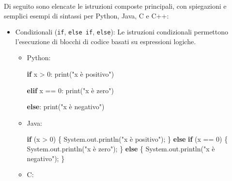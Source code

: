 \documentclass[
  letterpaper,
]{scrbook}
\newenvironment{Shaded}{\begin{snugshade}}{\end{snugshade}}
\newcommand{\BuiltInTok}[1]{\textcolor[rgb]{0.00,0.23,0.31}{#1}}
\newcommand{\ControlFlowTok}[1]{\textcolor[rgb]{0.00,0.23,0.31}{\textbf{#1}}}
\newcommand{\DecValTok}[1]{\textcolor[rgb]{0.68,0.00,0.00}{#1}}
\newcommand{\FunctionTok}[1]{\textcolor[rgb]{0.28,0.35,0.67}{#1}}
\newcommand{\NormalTok}[1]{\textcolor[rgb]{0.00,0.23,0.31}{#1}}
\newcommand{\OperatorTok}[1]{\textcolor[rgb]{0.37,0.37,0.37}{#1}}
\newcommand{\StringTok}[1]{\textcolor[rgb]{0.13,0.47,0.30}{#1}}
\begin{document}
Di seguito sono elencate le istruzioni composte principali, con
spiegazioni e semplici esempi di sintassi per Python, Java, C e C++:

\begin{itemize}
\item
  Condizionali (\texttt{if}, \texttt{else\ if}, \texttt{else}): Le
  istruzioni condizionali permettono l'esecuzione di blocchi di codice
  basati su espressioni logiche.

  \begin{itemize}
  \item
    Python:

\begin{Shaded}
\begin{Highlighting}[]
\ControlFlowTok{if}\NormalTok{ x }\OperatorTok{\textgreater{}} \DecValTok{0}\NormalTok{:}
  \BuiltInTok{print}\NormalTok{(}\StringTok{"x è positivo"}\NormalTok{)}

\ControlFlowTok{elif}\NormalTok{ x }\OperatorTok{==} \DecValTok{0}\NormalTok{:}
  \BuiltInTok{print}\NormalTok{(}\StringTok{"x è zero"}\NormalTok{)}

\ControlFlowTok{else}\NormalTok{:}
  \BuiltInTok{print}\NormalTok{(}\StringTok{"x è negativo"}\NormalTok{)}
\end{Highlighting}
\end{Shaded}
  \item
    Java:

\begin{Shaded}
\begin{Highlighting}[]
\ControlFlowTok{if} \OperatorTok{(}\NormalTok{x }\OperatorTok{\textgreater{}} \DecValTok{0}\OperatorTok{)} \OperatorTok{\{}
  \BuiltInTok{System}\OperatorTok{.}\FunctionTok{out}\OperatorTok{.}\FunctionTok{println}\OperatorTok{(}\StringTok{"x è positivo"}\OperatorTok{);}
\OperatorTok{\}} \ControlFlowTok{else} \ControlFlowTok{if} \OperatorTok{(}\NormalTok{x }\OperatorTok{==} \DecValTok{0}\OperatorTok{)} \OperatorTok{\{}
  \BuiltInTok{System}\OperatorTok{.}\FunctionTok{out}\OperatorTok{.}\FunctionTok{println}\OperatorTok{(}\StringTok{"x è zero"}\OperatorTok{);}
\OperatorTok{\}} \ControlFlowTok{else} \OperatorTok{\{}
  \BuiltInTok{System}\OperatorTok{.}\FunctionTok{out}\OperatorTok{.}\FunctionTok{println}\OperatorTok{(}\StringTok{"x è negativo"}\OperatorTok{);}
\OperatorTok{\}}
\end{Highlighting}
\end{Shaded}
  \item
    C:


\end{itemize}
\end{itemize}
\end{document}
